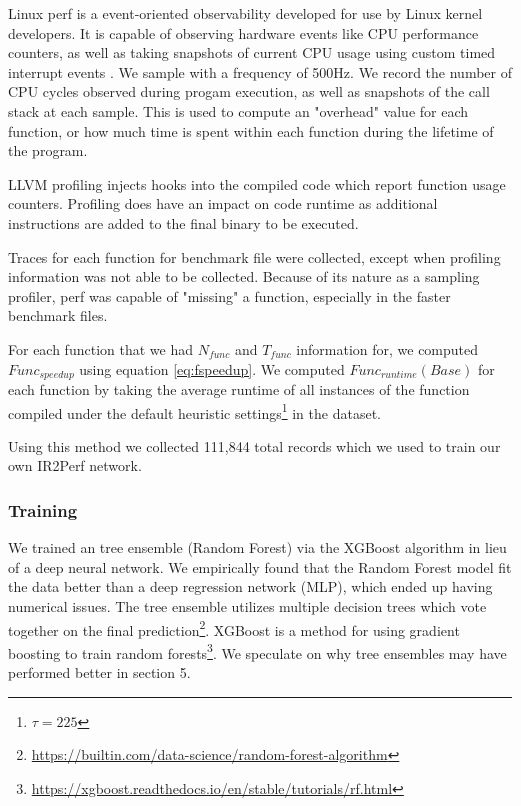 \documentclass[nohyperref]{article}
\theoremstyle{plain}
\theoremstyle{definition}
\theoremstyle{remark}
\begin{document}
Linux perf is a event-oriented observability developed for use by Linux kernel developers. It is capable of observing hardware events like CPU performance counters, as well as taking snapshots of current CPU usage using custom timed interrupt events \cite{perf}. We sample with a frequency of 500Hz. We record the number of CPU cycles observed during progam execution, as well as snapshots of the call stack at each sample. This is used to compute an "overhead" value for each function, or how much time is spent within each function during the lifetime of the program.

LLVM profiling injects hooks into the compiled code which report function usage counters. Profiling does have an impact on code runtime as additional instructions are added to the final binary to be executed.

Traces for each function for benchmark file were collected, except when profiling information was not able to be collected. Because of its nature as a sampling profiler, perf was capable of "missing" a function, especially in the faster benchmark files.

For each function that  we had $N_{func}$ and $T_{func}$ information for, we computed $Func_{speedup}$ using equation \ref{eq:fspeedup}. We computed $Func_{runtime}(Base)$ for each function by taking the average runtime of all instances of the function compiled under the default heuristic settings\footnote{$\tau = 225$} in the dataset.

Using this method we collected 111,844 total records which we used to train our own IR2Perf network.

\subsubsection{Training}
We trained an tree ensemble (Random Forest) via the XGBoost algorithm in lieu of a deep neural network. We empirically found that the Random Forest model fit the data better than a deep regression network (MLP), which ended up having numerical issues. The tree ensemble utilizes multiple decision trees which vote together on the final prediction\footnote{\href{https://builtin.com/data-science/random-forest-algorithm}{https://builtin.com/data-science/random-forest-algorithm}}. XGBoost is a method for using gradient boosting to train random forests\footnote{\href{https://xgboost.readthedocs.io/en/stable/tutorials/rf.html}{https://xgboost.readthedocs.io/en/stable/tutorials/rf.html}}. We speculate on why tree ensembles may have performed better in section 5.
\end{document}
